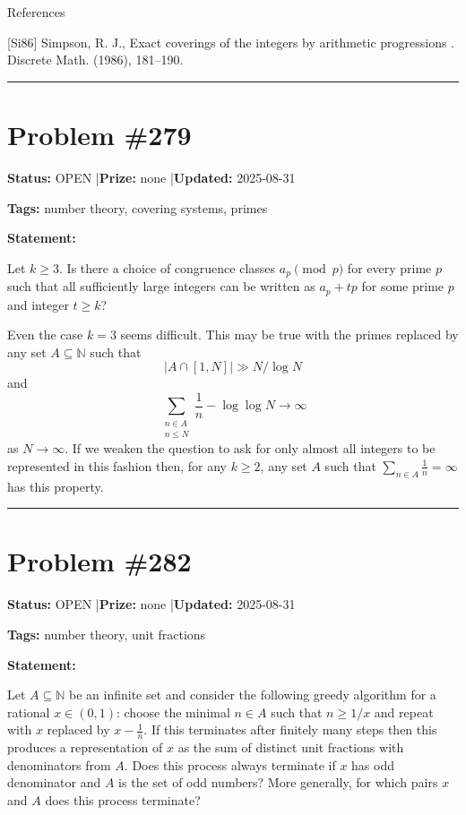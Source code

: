 \documentclass{article}
\begin{document}
References

[Si86] Simpson, R. J., Exact coverings of the integers by arithmetic progressions . Discrete Math. (1986), 181--190.

\noindent\rule{\linewidth}{0.4pt}


\section{Problem \#279}
\label{prob:279}

\noindent\textbf{Status:} OPEN \quad|\quad \textbf{Prize:} none \quad|\quad \textbf{Updated:} 2025-08-31

\noindent\textbf{Tags:} number theory, covering systems, primes

\medskip

\noindent\textbf{Statement:}

Let $k\geq 3$. Is there a choice of congruence classes $a_p\pmod{p}$ for every prime $p$ such that all sufficiently large integers can be written as $a_p+tp$ for some prime $p$ and integer $t\geq k$?




Even the case $k=3$ seems difficult. This may be true with the primes replaced by any set $A\subseteq \mathbb{N}$ such that\[\lvert A\cap [1,N]\rvert \gg N/\log N\]and\[\sum_{\substack{n\in A\\ n\leq N}}\frac{1}{n} -\log\log N\to \infty\]as $N\to \infty$. If we weaken the question to ask for only almost all integers to be represented in this fashion then, for any $k\geq 2$, any set $A$ such that $\sum_{n\in A}\frac{1}{n}=\infty$ has this property.

\noindent\rule{\linewidth}{0.4pt}


\section{Problem \#282}
\label{prob:282}

\noindent\textbf{Status:} OPEN \quad|\quad \textbf{Prize:} none \quad|\quad \textbf{Updated:} 2025-08-31

\noindent\textbf{Tags:} number theory, unit fractions

\medskip

\noindent\textbf{Statement:}

Let $A\subseteq \mathbb{N}$ be an infinite set and consider the following greedy algorithm for a rational $x\in (0,1)$: choose the minimal $n\in A$ such that $n\geq 1/x$ and repeat with $x$ replaced by $x-\frac{1}{n}$. If this terminates after finitely many steps then this produces a representation of $x$ as the sum of distinct unit fractions with denominators from $A$. Does this process always terminate if $x$ has odd denominator and $A$ is the set of odd numbers? More generally, for which pairs $x$ and $A$ does this process terminate?
\end{document}
